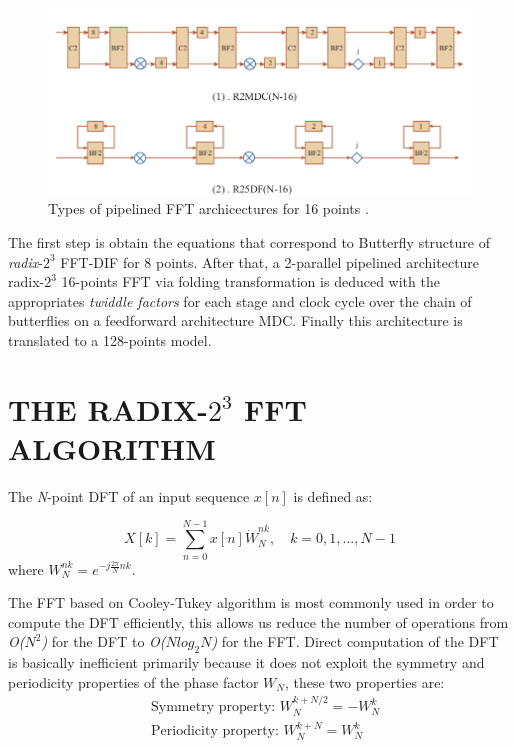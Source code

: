\documentclass[journal,comsoc]{IEEEtran}
\begin{document}
\begin{figure} 
	\centering
	\includegraphics[width=0.8\linewidth]{Diagramas/types_FFT.png}
	\caption{Types of pipelined FFT archicectures for 16 points \cite{type_FFT_MIT}.}
	\label{fig:types_fft}
\end{figure}

The first step is obtain the equations that correspond to Butterfly structure of \textit{radix}-$2^3$ FFT-DIF for 8 points. After that, a 2-parallel pipelined architecture radix-$2^3$ 16-points FFT via folding transformation is deduced with the appropriates \textit{twiddle factors} for each stage and clock cycle over the chain of butterflies on a feedforward architecture MDC. Finally this architecture is translated to a 128-points model. 


 
\section{THE RADIX-$2^3$ FFT ALGORITHM}
The \textit{N}-point DFT of an input sequence $x[n]$ is defined as:

\begin{equation}
	X[k] = \sum_{n=0}^{N-1} x[n] \dot W_N^{nk}, \quad k=0,1,...,N-1
\end{equation}
where $W_N^{nk} = e^{-j\frac{2\pi}{N} nk}$. 

The FFT based on Cooley-Tukey algorithm is most commonly used in order to compute the DFT efficiently, this allows us reduce the number of operations from \textit{O($N^2$)} for the DFT to \textit{O($Nlog_2N$)} for the FFT. Direct computation of the DFT is basically inefficient primarily because it does not exploit the symmetry and periodicity properties of the phase factor $W_N$, these two properties are:
\begin{align}
	&\text{Symmetry property: } W_N^{k+N/2} = -W_N^k	\\
	&\text{Periodicity property: } W_N^{k+N} = W_N^k
\end{align}
\end{document}
